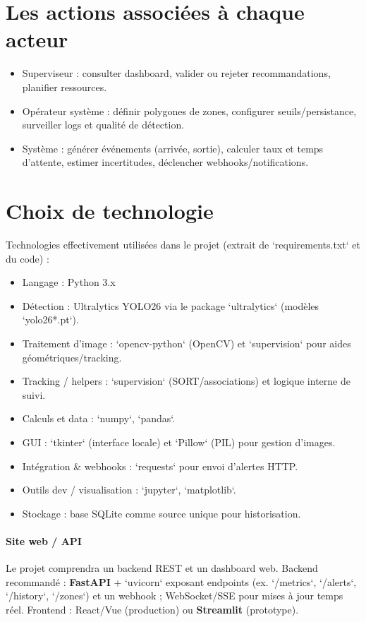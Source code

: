 \documentclass[11pt,a4paper]{article}
\begin{document}
\section{Les actions associées à chaque acteur}
\begin{itemize}
  \item Superviseur : consulter dashboard, valider ou rejeter recommandations, planifier ressources.
  \item Opérateur système : définir polygones de zones, configurer seuils/persistance, surveiller logs et qualité de détection.
  \item Système : générer événements (arrivée, sortie), calculer taux et temps d'attente, estimer incertitudes, déclencher webhooks/notifications.
\end{itemize}

\clearpage
\section{Choix de technologie}
Technologies effectivement utilisées dans le projet (extrait de `requirements.txt` et du code) :
\begin{itemize}
  \item Langage : Python 3.x
  \item Détection : Ultralytics YOLO26 via le package `ultralytics` (modèles `yolo26*.pt`).
  \item Traitement d'image : `opencv-python` (OpenCV) et `supervision` pour aides géométriques/tracking.
  \item Tracking / helpers : `supervision` (SORT/associations) et logique interne de suivi.
  \item Calculs et data : `numpy`, `pandas`.
  \item GUI : `tkinter` (interface locale) et `Pillow` (PIL) pour gestion d'images.
  \item Intégration \& webhooks : `requests` pour envoi d'alertes HTTP.
  \item Outils dev / visualisation : `jupyter`, `matplotlib`.
  \item Stockage : base SQLite comme source unique pour historisation.
\end{itemize}

\paragraph{Site web / API}
Le projet comprendra un backend REST et un dashboard web. Backend recommandé : \textbf{FastAPI} + `uvicorn` exposant endpoints (ex. `/metrics`, `/alerts`, `/history`, `/zones`) et un webhook ; WebSocket/SSE pour mises à jour temps réel. Frontend : React/Vue (production) ou \textbf{Streamlit} (prototype).
\end{document}
